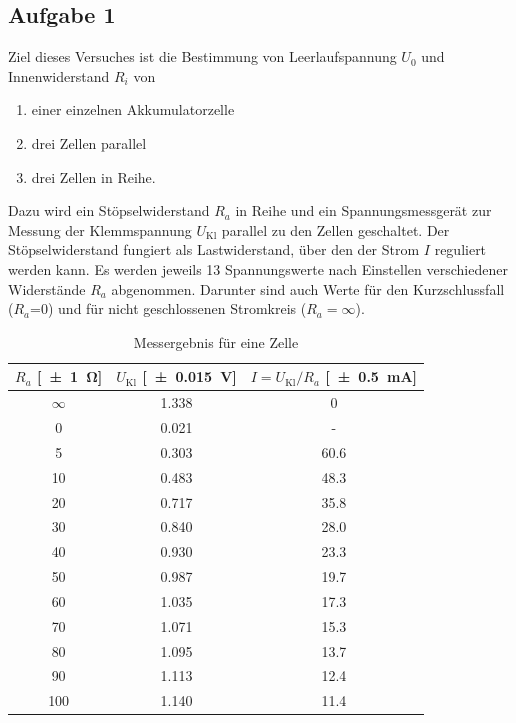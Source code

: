 \subsection{Aufgabe 1}
Ziel dieses Versuches ist die Bestimmung von Leerlaufspannung $U_0$ und Innenwiderstand $R_i$ von
\begin{enumerate}
  \item einer einzelnen Akkumulatorzelle
  \item drei Zellen parallel
  \item drei Zellen in Reihe.
\end{enumerate}
Dazu wird ein Stöpselwiderstand $R_a$ in Reihe und ein Spannungsmessgerät zur Messung der Klemmspannung $U_{\text{Kl}}$ parallel zu den Zellen geschaltet. Der Stöpselwiderstand fungiert als Lastwiderstand, über den der Strom $I$ reguliert werden kann. Es werden jeweils 13 Spannungswerte nach Einstellen verschiedener Widerstände $R_a$ abgenommen. Darunter sind auch Werte für den Kurzschlussfall ($R_a$=0) und für nicht geschlossenen Stromkreis ($R_a=\infty$).
\begin{table}[H]
  \centering
  \begin{tabular}{c c c} \toprule
    $R_a$ [\SI{\pm1}{\ohm}] & $U_{\text{Kl}}$ [\SI{\pm .015}{V}] & $I=U_{\text{Kl}}/R_a$ [\SI{\pm .5}{mA}] \\ \midrule
    $\infty$ & \num{1.338} & 0 \\
    0 & \num{0.021} & - \\
    5 & \num{0.303} & \num{60.6} \\
    10 & \num{.483} & \num{48.3} \\
    20 & \num{.717} & \num{35.8} \\
    30 & \num{.840} & \num{28.0} \\
    40 & \num{.930} & \num{23.3} \\
    50 & \num{.987} & \num{19.7} \\
    60 & \num{1.035} & \num{17.3} \\
    70 & \num{1.071} & \num{15.3} \\
    80 & \num{1.095} & \num{13.7} \\
    90 & \num{1.113} & \num{12.4} \\
    100 & \num{1.140} & \num{11.4} \\ \bottomrule
  \end{tabular}
  \caption{Messergebnis für eine Zelle}
  \label{tab:einezelle}
\end{table}

